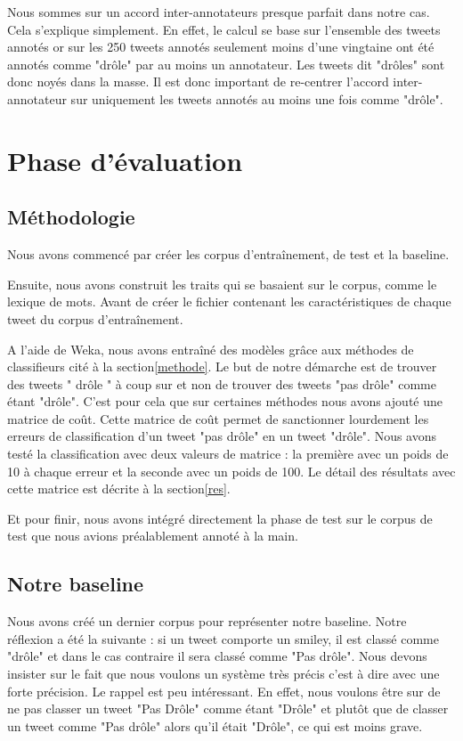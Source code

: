 \documentclass[10pt,a4paper,twoside]{article}
\begin{document}
Nous sommes sur un accord inter-annotateurs presque parfait dans notre cas. Cela s'explique simplement. En effet, le calcul se base sur l'ensemble des tweets annotés or sur les 250 tweets annotés seulement moins d'une vingtaine ont été annotés comme "drôle" par au moins un annotateur. Les tweets dit "drôles" sont donc noyés dans la masse. Il est donc important de re-centrer l'accord inter-annotateur sur uniquement les tweets annotés au moins une fois comme "drôle". 


\section{Phase d'évaluation}
\label{eval}
\subsection{Méthodologie}
Nous avons commencé par créer les corpus d'entraînement, de test et la baseline.

Ensuite, nous avons construit les traits qui se basaient sur le corpus, comme le lexique de mots. Avant de créer le fichier contenant les caractéristiques de chaque tweet du corpus d'entraînement.

A l'aide de Weka, nous avons entraîné des modèles grâce aux méthodes de classifieurs cité à la section\ref{methode}. Le but de notre démarche est de trouver des tweets " drôle " à coup sur et non de trouver des tweets "pas drôle" comme étant "drôle". C'est pour cela que sur certaines méthodes nous avons ajouté une matrice de coût. Cette matrice de coût permet de sanctionner lourdement les erreurs de classification d'un tweet "pas drôle" en un tweet "drôle". Nous avons testé la classification avec deux valeurs de matrice : la première avec un poids de 10 à chaque erreur et la seconde avec un poids de 100. Le détail des résultats avec cette matrice est décrite à la section\ref{res}.

Et pour finir, nous avons intégré directement la phase de test sur le corpus de test que nous avions préalablement annoté à la main.

\subsection{Notre baseline}
Nous avons créé un dernier corpus pour représenter notre baseline. Notre réflexion a été la suivante : si un tweet comporte un smiley, il est classé comme "drôle" et dans le cas contraire il sera classé comme "Pas drôle". Nous devons insister sur le fait que nous voulons un système très précis c'est à dire avec une forte précision. Le rappel est peu intéressant. En effet, nous voulons être sur de ne pas classer un tweet "Pas Drôle" comme étant "Drôle" et plutôt que de classer un tweet comme "Pas drôle" alors qu'il était "Drôle", ce qui est moins grave.
\end{document}
